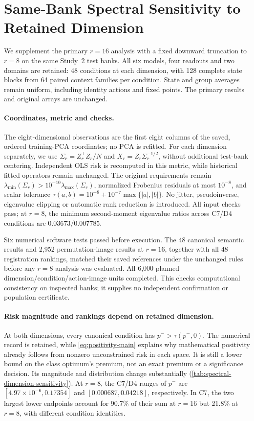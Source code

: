 \section{Same-Bank Spectral Sensitivity to Retained Dimension}
\label{app:spectral-dimension-sensitivity}
We supplement the primary $r=16$ analysis with a fixed downward truncation to $r=8$ on the same Study~2 test banks. All six models, four readouts and two domains are retained: 48 conditions at each dimension, with 128 complete state blocks from 64 paired context families per condition. State and group averages remain uniform, including identity actions and fixed points. The primary results and original arrays are unchanged.

\paragraph{Coordinates, metric and checks.}
The eight-dimensional observations are the first eight columns of the saved, ordered training-PCA coordinates; no PCA is refitted. For each dimension separately, we use $\Sigma_r=Z_r^\top Z_r/N$ and $X_r=Z_r\Sigma_r^{-1/2}$, without additional test-bank centering. Independent OLS risk is recomputed in this metric, while historical fitted operators remain unchanged. The original requirements remain $\lambda_{\min}(\Sigma_r)>10^{-10}\lambda_{\max}(\Sigma_r)$, normalized Frobenius residuals at most $10^{-8}$, and scalar tolerance $\tau(a,b)=10^{-8}+10^{-7}\max\{|a|,|b|\}$. No jitter, pseudoinverse, eigenvalue clipping or automatic rank reduction is introduced. All input checks pass; at $r=8$, the minimum second-moment eigenvalue ratios across C7/D4 conditions are $0.03673/0.007785$.

Six numerical software tests passed before execution. The 48 canonical semantic results and 2,952 permutation-image results at $r=16$, together with all 48 registration rankings, matched their saved references under the unchanged rules before any $r=8$ analysis was evaluated. All 6,000 planned dimension/condition/action-image units completed. This checks computational consistency on inspected banks; it supplies no independent confirmation or population certificate.



\paragraph{Risk magnitude and rankings depend on retained dimension.}
At both dimensions, every canonical condition has $p^->\tau(p^-,0)$. The numerical record is retained, while \cref{eq:positivity-main} explains why mathematical positivity already follows from nonzero unconstrained risk in each space. It is still a lower bound on the class optimum's premium, not an exact premium or a significance decision. Its magnitude and distribution change substantially (\cref{tab:spectral-dimension-sensitivity}). At $r=8$, the C7/D4 ranges of $p^-$ are $[4.97\times10^{-6},0.17354]$ and $[0.000687,0.04218]$, respectively. In C7, the two largest lower endpoints account for 90.7\% of their sum at $r=16$ but 21.8\% at $r=8$, with different condition identities.

